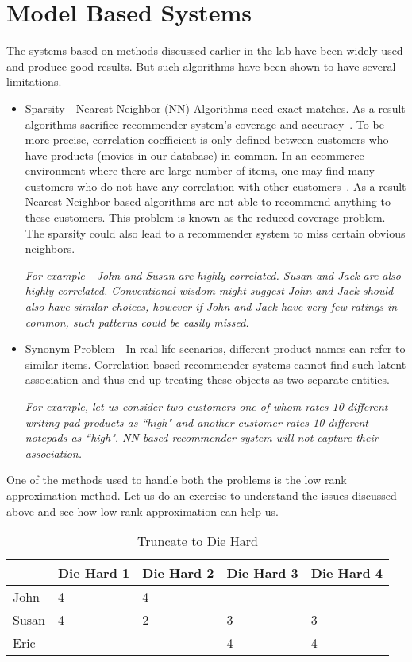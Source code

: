 \section{Model Based Systems}
  The systems based on methods discussed earlier in the lab have been widely used and produce good results. But such algorithms have been shown to have several limitations. 
  \begin{itemize}
    \item \underline{Sparsity} - Nearest Neighbor (NN) Algorithms need exact matches. As a result algorithms sacrifice recommender system's coverage and accuracy~\cite{model_ref1}. To be more precise, correlation coefficient is only defined between customers who have products (movies in our database) in common. In an ecommerce environment where there are large number of items, one may find many customers who do not have any correlation with other customers~\cite{model_ref2}. As a result Nearest Neighbor based algorithms are not able to recommend anything to these customers. This problem is known as the reduced coverage problem. The sparsity could also lead to a recommender system to miss certain obvious neighbors. 

\textit{For example - John and Susan are highly correlated. Susan and Jack are also highly correlated. Conventional wisdom might suggest John and Jack should also have similar choices, however if John and Jack have very few ratings in common, such patterns could be easily missed.}
    \item \underline{Synonym Problem} - In real life scenarios, different product names can refer to similar items. Correlation based recommender systems cannot find such latent association and thus end up treating these objects as two separate entities. 

\textit{For example, let us consider two customers one of whom rates 10 different writing pad products as ``high" and another customer rates 10 different notepads as ``high". NN based recommender system will not capture their association.}
  \end{itemize}
  One of the methods used to handle both the problems is the low rank approximation method. Let us do an exercise to understand the issues discussed above and see how low rank approximation can help us. \\
  \begin{table}[]
  \centering
  \label{my-label}
  \begin{tabular}{|l|l|l|l|l|}
  \hline
      & Die Hard 1 & Die Hard 2 & Die Hard 3 & Die Hard 4 \\ \hline
John  & 4          & 4          &            &            \\ \hline
Susan & 4          & 2          & 3          & 3          \\ \hline
Eric  &            &            & 4          & 4          \\ \hline
  \end{tabular}
  \caption{Truncate to Die Hard}
  \label{Model-1}
  \end{table}
